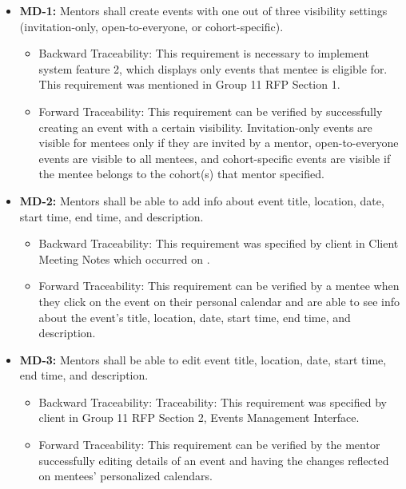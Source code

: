 \begin{itemize}[label=$\bullet$]
    \item \textbf{MD-1:} Mentors shall create events with one out of three
    visibility settings (invitation-only, open-to-everyone, or cohort-specific).
    \begin{itemize}
        \item Backward Traceability: This requirement is necessary to implement
        system feature 2, which displays only events that mentee is eligible
        for. This requirement was mentioned in Group 11 RFP Section 1.

        \item Forward Traceability: This requirement can be verified by
        successfully creating an event with a certain visibility.
        Invitation-only events are visible for mentees only if they are invited
        by a mentor, open-to-everyone events are visible to all mentees, and
        cohort-specific events are visible if the mentee belongs to the
        cohort(s) that mentor specified.
    \end{itemize}
    
    \item \textbf{MD-2:} Mentors shall be able to add info about event title,
    location, date, start time, end time, and description.
    \begin{itemize}
        \item Backward Traceability: This requirement was specified by client in
        Client Meeting Notes which occurred on .

        \item Forward Traceability: This requirement can be verified by a mentee
        when they click on the event on their personal calendar and are able to
        see info about the event's title, location, date, start time, end time,
        and description.
    \end{itemize}
    
    \item \textbf{MD-3:} Mentors shall be able to edit event title, location,
    date, start time, end time, and description.
    \begin{itemize}
        \item Backward Traceability: Traceability: This requirement was
        specified by client in Group 11 RFP Section 2, Events Management
        Interface.

        \item Forward Traceability: This requirement can be verified by the
        mentor successfully editing details of an event and having the changes
        reflected on mentees' personalized calendars.
    \end{itemize}
    

\end{itemize}

